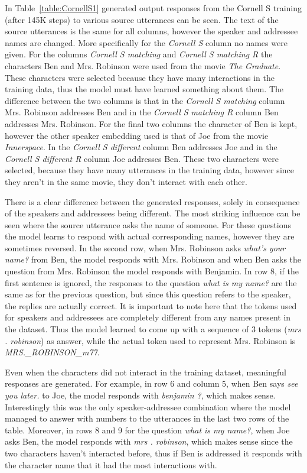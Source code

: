 \documentclass[12pt]{article}
\begin{document}
In Table~\ref{table:CornellS1} generated output responses from the Cornell S training (after 145K steps) to various source utterances can be seen. The text of the source utterances is the same for all columns, however the speaker and addressee names are changed. More specifically for the \textit{Cornell S} column no names were given. For the columns \textit{Cornell S matching} and \textit{Cornell S matching R} the characters Ben and Mrs. Robinson were used from the movie \textit{The Graduate}. These characters were selected because they have many interactions in the training data, thus the model must have learned something about them. The difference between the two columns is that in the \textit{Cornell S matching} column Mrs. Robinson addresses Ben and in the \textit{Cornell S matching R} column Ben addresses Mrs. Robinson. For the final two columns the character of Ben is kept, however the other speaker embedding used is that of Joe from the movie \textit{Innerspace}. In the \textit{Cornell S different} column Ben addresses Joe and in the \textit{Cornell S different R} column Joe addresses Ben. These two characters were selected, because they have many utterances in the training data, however since they aren't in the same movie, they don't interact with each other.

There is a clear difference between the generated responses, solely in consequence of the speakers and addressees being different. The most striking influence can be seen where the source utterance asks the name of someone. For these questions the model learns to respond with actual corresponding names, however they are sometimes reversed. In the second row, when Mrs. Robinson asks \textit{what's your name?} from Ben, the model responds with Mrs. Robinson and when Ben asks the question from Mrs. Robinson the model responds with Benjamin. In row 8, if the first sentence is ignored, the responses to the question \textit{what is my name?} are the same as for the previous question, but since this question refers to the speaker, the replies are actually correct. It is important to note here that the tokens used for speakers and addressees are completely different from any names present in the dataset. Thus the model learned to come up with a sequence of 3 tokens (\textit{mrs . robinson}) as answer, while the actual token used to represent Mrs. Robinson is \textit{MRS.\_ROBINSON\_m77}.

Even when the characters did not interact in the training dataset, meaningful responses are generated. For example, in row 6 and column 5, when Ben says \textit{see you later.} to Joe, the model responds with \textit{benjamin ?}, which makes sense. Interestingly this was the only speaker-addressee combination where the model managed to answer with numbers to the utterances in the last two rows of the table. Moreover, in rows 8 and 9 for the question \textit{what is my name?}, when Joe asks Ben, the model responds with \textit{mrs . robinson}, which makes sense since the two characters haven't interacted before, thus if Ben is addressed it responds with the character name that it had the most interactions with.
\end{document}
